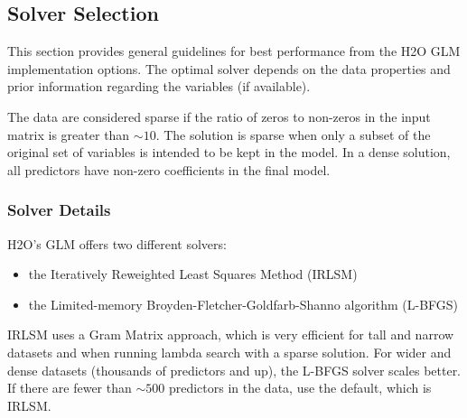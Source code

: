 \subsection{Solver Selection}

This section provides general guidelines for best performance from the H2O GLM implementation options. The optimal solver depends on the data properties and prior information regarding the variables (if available). 

The data are considered sparse if the ratio of zeros to non-zeros in the input matrix is greater than $\sim 10$. The solution is sparse when only a subset of the original set of variables is intended to be kept in the model. In a dense solution, all predictors have non-zero coefficients in the final model.  

\subsubsection{Solver Details}
H2O's GLM offers two different solvers: 

\begin{itemize}
\item the Iteratively Reweighted Least Squares Method (IRLSM)
\item the Limited-memory Broyden-Fletcher-Goldfarb-Shanno algorithm (L-BFGS)
\end{itemize}

IRLSM uses a Gram Matrix approach, which is very efficient for tall and narrow datasets and when running lambda search with a sparse solution.  For wider and dense
datasets (thousands of predictors and up), the L-BFGS solver scales better. If there are fewer than $\sim 500$ predictors in the data, use the default, which is IRLSM. 

